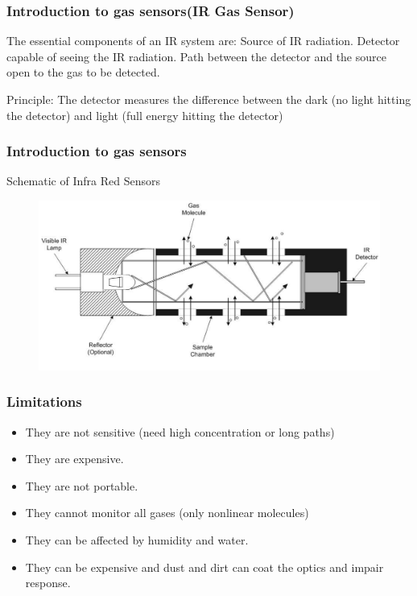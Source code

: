 \documentclass{beamer}
\begin{document}
\begin{frame}
\frametitle{Introduction to gas sensors(IR Gas Sensor)}
The essential components of an IR system are:\newline
 Source of IR radiation.\newline
Detector capable of seeing the IR radiation.\newline
Path between the detector and the source open to the gas to be detected.\newline

Principle:\newline
The detector measures the difference between the dark (no light hitting the detector)
and light (full energy hitting the detector)
\end{frame}

\begin{frame}
\frametitle{Introduction to gas sensors} Schematic of
Infra Red Sensors
\begin{figure}[tbh]
\begin{center}
\includegraphics[width= 4 in]{IR.pdf}
\end{center}
\end{figure}
\end{frame}

\begin{frame}
\frametitle{Limitations}
\begin{itemize}
\item They are not sensitive (need high concentration or long paths)
  \item They are expensive.
  \item They are not portable.
  \item They cannot monitor all gases (only nonlinear molecules)
  \item They can be affected by humidity and water.
  \item They can be expensive and dust and dirt can coat the optics and impair response.\newline
\end{itemize}
\end{frame}
\end{document}
